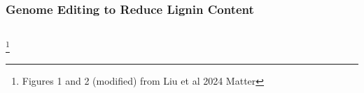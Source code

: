 \documentclass[xcolor=dvipsnames]{beamer}
\newcommand\blfootnote[1]{%
	\begingroup
	\renewcommand\thefootnote{}\footnote{#1}%
	\addtocounter{footnote}{-1}%
	\endgroup
}
\begin{document}
\begin{frame}
	\frametitle{Genome Editing to Reduce Lignin Content}
	
	
	\begin{columns}
		\begin{column}{0.5\textwidth}
		\end{column}
		\begin{column}{0.5\textwidth}
		\end{column}
	\end{columns}
	
	
	
	
						\blfootnote{Figures 1 and 2 (modified) from Liu et al 2024 Matter}
						\end{frame}
\end{document}
